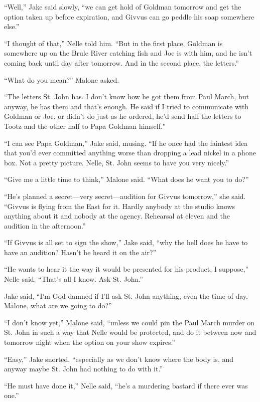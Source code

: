 \documentclass{novel}
\begin{document}
“Well,” Jake said slowly, “we can get hold of Goldman tomorrow and get the option taken up before expiration, and Givvus can go peddle his soap somewhere else.”

“I thought of that,” Nelle told him. “But in the first place, Goldman is somewhere up on the Brule River catching fish and Joe is with him, and he isn’t coming back until day after tomorrow. And in the second place, the letters.”

“What do you mean?” Malone asked.

“The letters St. John has. I don’t know how he got them from Paul March, but anyway, he has them and that’s enough. He said if I tried to communicate with Goldman or Joe, or didn’t do just as he ordered, he’d send half the letters to Tootz and the other half to Papa Goldman himself."

“I can see Papa Goldman,” Jake said, musing. “If he once had the faintest idea that you’d ever committed anything worse than dropping a lead nickel in a phone box. Not a pretty picture. Nelle, St. John seems to have you very nicely.”

“Give me a little time to think,” Malone said. “What does he want you to do?”

“He’s planned a secret—very secret—audition for Givvus tomorrow,” she said. “Givvus is flying from the East for it. Hardly anybody at the studio knows anything about it and nobody at the agency. Rehearsal at eleven and the audition in the afternoon.”

“If Givvus is all set to sign the show,” Jake said, “why the hell does he have to have an audition? Hasn’t he heard it on the air?”

“He wants to hear it the way it would be presented for his product, I suppose,” Nelle said. “That’s all I know. Ask St. John.”

Jake said, “I’m God damned if I'll ask St. John anything, even the time of day. Malone, what are we going to do?”

“I don’t know yet,” Malone said, “unless we could pin the Paul March murder on St. John in such a way that Nelle would be protected, and do it between now and tomorrow night when the option on your show expires.”

“Easy,” Jake snorted, “especially as we don’t know where the body is, and anyway maybe St. John had nothing to do with it.”

“He must have done it,” Nelle said, “he’s a murdering bastard if there ever was one.”
\end{document}
